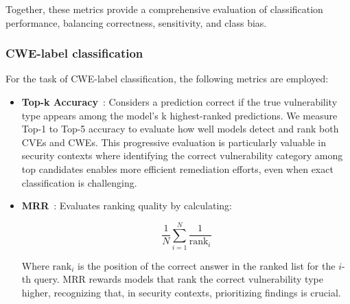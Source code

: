 \documentclass[lettersize,journal]{IEEEtran}
\begin{document}
Together, these metrics provide a comprehensive evaluation of classification performance, balancing correctness, sensitivity, and class bias.

\subsubsection{CWE-label classification}
\label{section:cwe_metrics}
For the task of CWE-label classification, the following metrics are employed:

\begin{itemize}

	\item \textbf{Top-k Accuracy}~\cite{russakovsky2015imagenet}: Considers a prediction correct if the true vulnerability type appears among the model's k highest-ranked predictions. We measure Top-1 to Top-5 accuracy to evaluate how well models detect and rank both CVEs and CWEs. This progressive evaluation is particularly valuable in security contexts where identifying the correct vulnerability category among top candidates enables more efficient remediation efforts, even when exact classification is challenging.

	\item \textbf{\gls{MRR}}~\cite{craswell2009mean}: Evaluates ranking quality by calculating:
    
    \begin{equation}
        \frac{1}{N}\sum_{i=1}^{N}\frac{1}{\text{rank}_i}
    \end{equation}
    
    Where $\text{rank}_i$ is the position of the correct answer in the ranked list for the $i$-th query. MRR rewards models that rank the correct vulnerability type higher, recognizing that, in security contexts, prioritizing findings is crucial.


\end{itemize}
\end{document}
